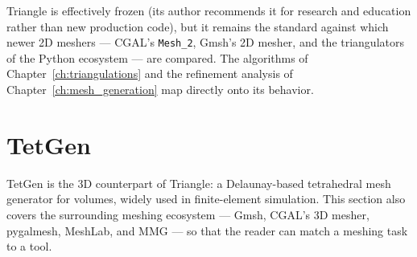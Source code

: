 Triangle is effectively frozen (its author recommends it for research
and education rather than new production code), but it remains the
standard against which newer 2D meshers --- CGAL's \texttt{Mesh\_2},
Gmsh's 2D mesher, and the triangulators of the Python ecosystem --- are
compared. The algorithms of Chapter~\ref{ch:triangulations} and the
refinement analysis of Chapter~\ref{ch:mesh_generation} map directly
onto its behavior.

\section{TetGen}
\label{sec:app_soft_tetgen}

TetGen is the 3D counterpart of Triangle: a Delaunay-based tetrahedral
mesh generator for volumes, widely used in finite-element simulation.
This section also covers the surrounding meshing ecosystem --- Gmsh,
CGAL's 3D mesher, pygalmesh, MeshLab, and MMG --- so that the reader can
match a meshing task to a tool.

